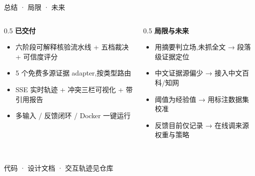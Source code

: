 \documentclass[aspectratio=169,11pt]{beamer}
\begin{document}
\begin{frame}{总结 · 局限 · 未来}
  \begin{columns}[T]
    \begin{column}{0.5\textwidth}
      \textbf{已交付}
      \footnotesize
      \begin{itemize}
        \item 六阶段可解释核验流水线 + 五档裁决 + 可信度评分
        \item 5 个免费多源证据 adapter,按类型路由
        \item SSE 实时轨迹 + 冲突三栏可视化 + 带引用报告
        \item 多输入 / 反馈闭环 / Docker 一键运行
      \end{itemize}
    \end{column}
    \begin{column}{0.5\textwidth}
      \textbf{局限与未来}
      \footnotesize
      \begin{itemize}
        \item 用摘要判立场,未抓全文 → 段落级证据定位
        \item 中文证据源偏少 → 接入中文百科/知网
        \item 阈值为经验值 → 用标注数据集校准
        \item 反馈目前仅记录 → 在线调来源权重与策略
      \end{itemize}
    \end{column}
  \end{columns}
  \vfill
  \\
  {\scriptsize\color{slate} 代码 · 设计文档 · 交互轨迹见仓库}
\end{frame}
\end{document}
